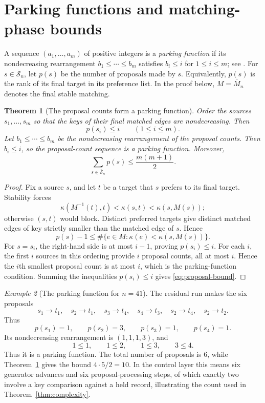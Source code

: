 \documentclass[11pt]{amsart}
\newtheorem{theorem}{Theorem}[section]
\theoremstyle{definition}
\theoremstyle{remark}
\newtheorem{example}[theorem]{Example}
\newcommand{\Sbar}{\overline{\mathcal S}_n}
\begin{document}
\section{Parking functions and matching-phase bounds}\label{sec:complexity}

A sequence $(a_1,\ldots,a_m)$ of positive integers is a \emph{parking
function} if its nondecreasing rearrangement $b_1\le\cdots\le b_m$ satisfies
$b_i\le i$ for $1\le i\le m$; see \cite{KonheimWeiss,StanleyParking}.
For $s\in\Sbar$, let $p(s)$ be the number of proposals made by $s$.
Equivalently, $p(s)$ is the rank of its final target in its preference list.
In the proof below, $M=\overline M_n$ denotes the final stable matching.

\begin{theorem}[The proposal counts form a parking function]
\label{thm:parking}
Order the sources $s_1,\ldots,s_m$ so that the keys of their final matched
edges are nondecreasing.  Then
\[
 p(s_i)\le i
 \qquad(1\le i\le m).
\]
Let $b_1\le\cdots\le b_m$ be the nondecreasing rearrangement of the proposal
counts.  Then $b_i\le i$, so the proposal-count sequence is a parking
function.  Moreover,
\begin{equation}\label{eq:proposal-bound}
 \sum_{s\in\Sbar}p(s)\le\frac{m(m+1)}2.
\end{equation}
\end{theorem}

\begin{proof}
Fix a source $s$, and let $t$ be a target that $s$ prefers to its final target.
Stability forces
\[
 \kappa(M^{-1}(t),t)<\kappa(s,t)<\kappa(s,M(s));
\]
otherwise $(s,t)$ would block.  Distinct preferred targets give distinct
matched edges of key strictly smaller than the matched edge of $s$.  Hence
\[
 p(s)-1\le
 \#\{e\in M:\kappa(e)<\kappa(s,M(s))\}.
\]
For $s=s_i$, the right-hand side is at most $i-1$, proving $p(s_i)\le i$.
For each $i$, the first $i$ sources in this ordering provide $i$ proposal
counts, all at most $i$.  Hence the $i$th smallest proposal count is at most
$i$, which is the parking-function condition.
Summing the inequalities $p(s_i)\le i$ gives \eqref{eq:proposal-bound}.
\end{proof}

\begin{example}[The parking function for $n=41$]
\label{ex:parking-41}
The residual run makes the six proposals
\[
 s_1\to t_1,
 \quad s_2\to t_1,
 \quad s_3\to t_4,
 \quad s_4\to t_3,
 \quad s_2\to t_4,
 \quad s_2\to t_2.
\]
Thus
\[
 p(s_1)=1,\qquad p(s_2)=3,\qquad p(s_3)=1,\qquad p(s_4)=1.
\]
Its nondecreasing rearrangement is $(1,1,1,3)$, and
\[
 1\le1,\qquad 1\le2,\qquad 1\le3,\qquad 3\le4.
\]
Thus it is a parking function.  The total number of proposals is $6$, while
Theorem~\ref{thm:parking} gives the bound
$4\cdot5/2=10$.  In the control layer this means six generator advances and
six proposal-processing steps, of which exactly two involve a key comparison
against a held record, illustrating the count used in
Theorem~\ref{thm:complexity}.
\end{example}
\end{document}
